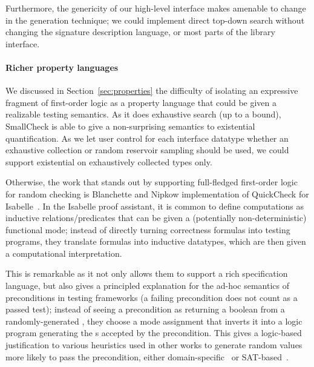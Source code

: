 Furthermore, the genericity of our high-level interface makes
 amenable to change in the generation technique; we
could implement direct top-down search without changing the signature
description language, or most parts of the library interface.

\paragraph{Richer property languages}

We discussed in Section~\ref{sec:properties} the difficulty of
isolating an expressive fragment of first-order logic as a property
language that could be given a realizable testing semantics. As it
does exhaustive search (up to a bound), SmallCheck is able to give
a non-surprising semantics to existential quantification. As we let
user control for each interface datatype whether an exhaustive
collection or random reservoir sampling should be used, we could
support existential on exhaustively collected types only.

Otherwise, the work that stands out by supporting full-fledged
first-order logic for random checking is Blanchette and Nipkow
implementation of QuickCheck for Isabelle~\cite{quicheck-isabelle}. In
the Isabelle proof assistant, it is common to define computations as
inductive relations/predicates that can be given a (potentially
non-deterministic) functional mode; instead of directly turning
correctness formulas into testing programs, they translate formulas
into inductive datatypes, which are then given a computational
interpretation.

This is remarkable as it not only allows them to support a rich
specification language, but also gives a principled explanation for
the ad-hoc semantics of preconditions in testing frameworks (a failing
precondition does not count as a passed test); instead of seeing
a precondition  as returning a boolean from
a randomly-generated , they choose a mode assignment that
inverts it into a logic program generating the s accepted by
the precondition. This gives a logic-based justification to various
heuristics used in other works to generate random values more likely
to pass the precondition, either domain-specific~\cite{foo} or
SAT-based~\cite{bar}.
